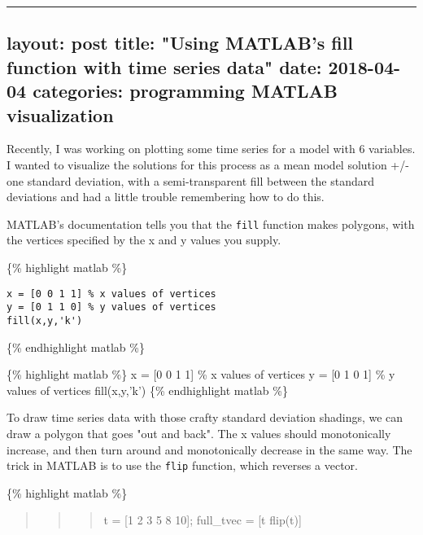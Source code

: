 \documentclass[
]{article}
\date{}
\begin{document}
\begin{center}\rule{0.5\linewidth}{\linethickness}\end{center}

\hypertarget{layout-post-title-using-matlabs-fill-function-with-time-series-data-date-2018-04-04-categories-programming-matlab-visualization}{%
\subsection{layout: post title: "Using MATLAB's fill function with time
series data" date: 2018-04-04 categories: programming MATLAB
visualization}\label{layout-post-title-using-matlabs-fill-function-with-time-series-data-date-2018-04-04-categories-programming-matlab-visualization}}

Recently, I was working on plotting some time series for a model with 6
variables. I wanted to visualize the solutions for this process as a
mean model solution +/- one standard deviation, with a semi-transparent
fill between the standard deviations and had a little trouble
remembering how to do this.

MATLAB's documentation tells you that the \texttt{fill} function makes
polygons, with the vertices specified by the x and y values you supply.

\{\% highlight matlab \%\}

\begin{verbatim}
x = [0 0 1 1] % x values of vertices
y = [0 1 1 0] % y values of vertices 
fill(x,y,'k')
\end{verbatim}

\{\% endhighlight matlab \%\}

\{\% highlight matlab \%\} x = {[}0 0 1 1{]} \% x values of vertices y =
{[}0 1 0 1{]} \% y values of vertices fill(x,y,'k') \{\% endhighlight
matlab \%\}

To draw time series data with those crafty standard deviation shadings,
we can draw a polygon that goes "out and back". The x values should
monotonically increase, and then turn around and monotonically decrease
in the same way. The trick in MATLAB is to use the \texttt{flip}
function, which reverses a vector.

\{\% highlight matlab \%\}

\begin{quote}
\begin{quote}
\begin{quote}
t = {[}1 2 3 5 8 10{]}; full\_tvec = {[}t flip(t){]}
\end{quote}
\end{quote}
\end{quote}
\end{document}
